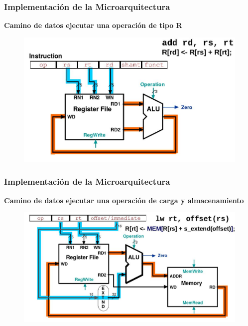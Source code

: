 \documentclass[aspectratio=169,compress]{beamer}
\begin{document}
\begin{footnotesize}
\begin{frame}
\end{frame}



\begin{frame}
\frametitle{Implementación de la Microarquitectura}
\begin{center}\textbf{Camino de datos ejecutar una operación de tipo R}\end{center}
\begin{figure}
\includegraphics[scale=0.3]{images/tipo-r.jpg} 
\end{figure}

\end{frame}


\begin{frame}
\frametitle{Implementación de la Microarquitectura}
\begin{center}\textbf{Camino de datos ejecutar una operación de carga y almacenamiento}\end{center}
\begin{figure}
\includegraphics[scale=0.3]{images/tipo-i.jpg} 
\end{figure}

\end{frame}





\end{footnotesize}
\end{document}
